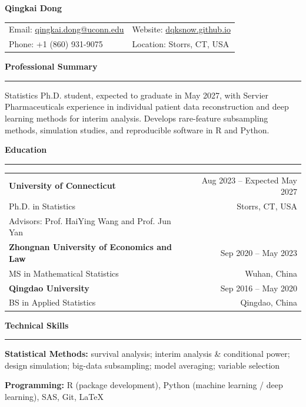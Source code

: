 \documentclass[a4paper,10pt]{article}
\newcommand{\majoritemsep}{\vspace{4pt}}
\newcommand{\resheading}[1]{
  \vspace{4pt}
  \noindent\textbf{\large #1}\par
  \vspace{2pt}
  \hrule
  \vspace{4pt}
}
\newenvironment{reslist}[1][0pt]{%
  \begin{list}{}{%
    \setlength{\leftmargin}{0pt}%
    \setlength{\rightmargin}{0pt}%
    \setlength{\labelwidth}{0pt}%
    \setlength{\labelsep}{0pt}%
    \setlength{\itemindent}{0pt}%
    \setlength{\listparindent}{0pt}%
    \setlength{\itemsep}{#1}%
    \setlength{\topsep}{0pt}%
    \setlength{\parsep}{0pt}%
    \setlength{\partopsep}{0pt}%
  }%
}{\end{list}}
\begin{document}
\begin{center}
    {\LARGE \textbf{Qingkai Dong}} \\
    \vspace{2pt}
    \begin{tabular}{ll}
      Email: \href{mailto:qingkai.dong@uconn.edu}{qingkai.dong@uconn.edu} &
      Website: \href{https://dqksnow.github.io}{dqksnow.github.io} \\
      Phone: +1 (860) 931-9075 &
      Location: Storrs, CT, USA
    \end{tabular}
\end{center}

\resheading{Professional Summary}
Statistics Ph.D. student, expected to graduate in May 2027, with Servier Pharmaceuticals experience in individual patient data reconstruction and deep learning methods for interim analysis. Develops rare-feature subsampling methods, simulation studies, and reproducible software in R and Python.
\majoritemsep

\resheading{Education}
\noindent\begin{tabular*}{\textwidth}{@{}l@{\extracolsep{\fill}}r@{}}
\textbf{University of Connecticut} & Aug 2023 -- Expected May 2027 \\
Ph.D. in Statistics & Storrs, CT, USA \\
Advisors: Prof. HaiYing Wang and Prof. Jun Yan & \\[4pt]

\textbf{Zhongnan University of Economics and Law} & Sep 2020 -- May 2023 \\
MS in Mathematical Statistics & Wuhan, China \\[4pt]

\textbf{Qingdao University} & Sep 2016 -- May 2020 \\
BS in Applied Statistics & Qingdao, China \\
\end{tabular*}\par
\majoritemsep

\resheading{Technical Skills}
\begin{reslist}[2pt]
  \item \textbf{Statistical Methods:} survival analysis; interim analysis \& conditional power; design simulation; big-data subsampling; model averaging; variable selection
  \item \textbf{Programming:} R (package development), Python (machine learning / deep learning), SAS, Git, LaTeX
\end{reslist}
\majoritemsep
\end{document}
